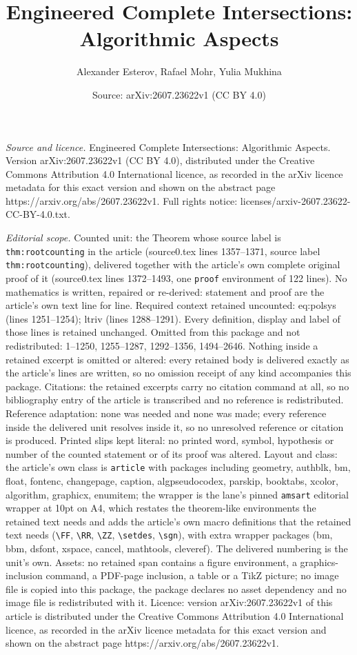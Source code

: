 \documentclass[10pt,a4paper]{amsart}
\title[Engineered Complete Intersections: Algorithmic Aspects]{Engineered Complete Intersections: Algorithmic Aspects}
\author{Alexander Esterov, Rafael Mohr, Yulia Mukhina}
\date{Source: arXiv:2607.23622v1 (CC BY 4.0)}
\begin{document}
\maketitle

\noindent\emph{Source and licence.} Engineered Complete Intersections: Algorithmic Aspects. Version arXiv:2607.23622v1 (CC BY 4.0), distributed under the Creative Commons Attribution 4.0 International licence, as recorded in the arXiv licence metadata for this exact version and shown on the abstract page https://arxiv.org/abs/2607.23622v1. Full rights notice: licenses/arxiv-2607.23622-CC-BY-4.0.txt.\par\smallskip

\noindent\textit{Editorial scope.} Counted unit: the Theorem whose source label is \texttt{thm:rootcounting} in the article (source0.tex lines 1357--1371, source label \texttt{thm:rootcounting}), delivered together with the article's own complete original proof of it (source0.tex lines 1372--1493, one \texttt{proof} environment of 122 lines). No mathematics is written, repaired or re-derived: statement and proof are the article's own text line for line. Required context retained uncounted: eq:polsys (lines 1251--1254); ltriv (lines 1288--1291). Every definition, display and label of those lines is retained unchanged. Omitted from this package and not redistributed: 1--1250, 1255--1287, 1292--1356, 1494--2646. Nothing inside a retained excerpt is omitted or altered: every retained body is delivered exactly as the article's lines are written, so no omission receipt of any kind accompanies this package. Citations: the retained excerpts carry no citation command at all, so no bibliography entry of the article is transcribed and no reference is redistributed. Reference adaptation: none was needed and none was made; every reference inside the delivered unit resolves inside it, so no unresolved reference or citation is produced. Printed slips kept literal: no printed word, symbol, hypothesis or number of the counted statement or of its proof was altered. Layout and class: the article's own class is \texttt{article} with packages including geometry, authblk, bm, float, fontenc, changepage, caption, algpseudocodex, parskip, booktabs, xcolor, algorithm, graphicx, enumitem; the wrapper is the lane's pinned \texttt{amsart} editorial wrapper at 10pt on A4, which restates the theorem-like environments the retained text needs and adds the article's own macro definitions that the retained text needs (\texttt{\textbackslash FF}, \texttt{\textbackslash RR}, \texttt{\textbackslash ZZ}, \texttt{\textbackslash setdes}, \texttt{\textbackslash sgn}), with extra wrapper packages (bm, bbm, dsfont, xspace, cancel, mathtools, cleveref). The delivered numbering is the unit's own. Assets: no retained span contains a figure environment, a graphics-inclusion command, a PDF-page inclusion, a table or a TikZ picture; no image file is copied into this package, the package declares no asset dependency and no image file is redistributed with it. Licence: version arXiv:2607.23622v1 of this article is distributed under the Creative Commons Attribution 4.0 International licence, as recorded in the arXiv licence metadata for this exact version and shown on the abstract page https://arxiv.org/abs/2607.23622v1. 
\end{document}

